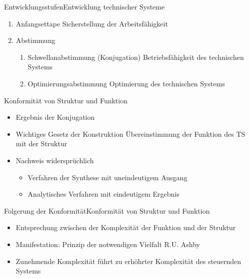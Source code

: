 \documentclass[aspectratio=169]{beamer}
\begin{document}
    \begin{frame}{Entwicklungsstufen}{Entwicklung technischer Systeme}
        \begin{enumerate}
            \item Anfangsettape \newline
            {\scriptsize Sicherstellung der Arbeitsfähigkeit}
            \item Abstimmung
            \begin{enumerate}
                \item Schwellanabstimmung (Konjugation) \newline
                {\scriptsize Betriebsfähigkeit des technischen Systems}
                \item Optimierungsabstimmung \newline
                {\scriptsize Optimierung des technischen Systems}
            \end{enumerate}
        \end{enumerate}
    \end{frame}

    \begin{frame}{Konformität von Struktur und Funktion}
        \begin{itemize}
            \item Ergebnis der Konjugation
            \item Wichtiges Gesetz der Konstruktion \newline
            {\scriptsize Übereinstimmung der Funktion des TS mit der Struktur}
            \item Nachweis widersprüchlich
            \begin{itemize}
                \item Verfahren der Synthese mit uneindeutigem Ausgang
                \item Analytisches Verfahren mit eindeutigem Ergebnis
            \end{itemize}
        \end{itemize}
    \end{frame}

    \begin{frame}{Folgerung der Konformität}{Konformität von Struktur und Funktion}
        \begin{itemize}
            \item Entsprechung zwischen der Komplexität der Funktion und der Struktur
            \item Manifestation: \glqq Prinzip der notwendigen Vielfalt\grqq{} R.U. Ashby
            \item Zunehmende Komplexität führt zu erhöhrter Komplexität des steuernden Systems
        \end{itemize}
    \end{frame}
\end{document}
